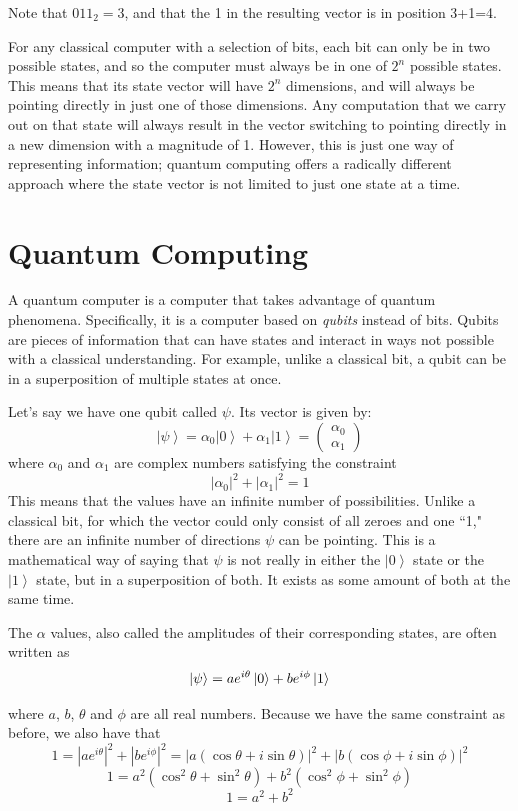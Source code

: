 \documentclass[11pt]{report}
\newcommand{\?}{\stackrel{?}{=}}
\begin{document}
Note that $011_2 = 3$, and that the 1 in the resulting vector is in position 3+1=4.

For any classical computer with a selection of bits, each bit can only be in two possible states, and so the computer must always be in one of $2^n$ possible states. This means that its state vector will have $2^n$ dimensions, and will always be pointing directly in just one of those dimensions. Any computation that we carry out on that state will always result in the vector switching to pointing directly in a new dimension with a magnitude of 1. However, this is just one way of representing information; quantum computing offers a radically different approach where the state vector is not limited to just one state at a time.

\section{Quantum Computing}
A quantum computer is a computer that takes advantage of quantum phenomena. Specifically, it is a computer based on \textit{qubits} instead of bits. Qubits are pieces of information that can have states and interact in ways not possible with a classical understanding. For example, unlike a classical bit, a qubit can be in a superposition of multiple states at once.

Let’s say we have one qubit called $\psi$. Its vector is given by:
$$ \left | \psi \right \rangle=\alpha _{0}\left | 0 \right \rangle+\alpha _{1}\left | 1 \right \rangle=\begin{pmatrix}\alpha_{0}\\ \alpha_{1}\end{pmatrix}$$
where $\alpha _{0}$ and $\alpha_{1}$ are complex numbers satisfying the constraint 
$$ \left | \alpha_{0} \right |^{2} + \left | \alpha_{1} \right |^{2}=1$$
This means that the  values have an infinite number of possibilities. Unlike a classical bit, for which the vector could only consist of all zeroes and one ``1," there are an infinite number of directions $\psi$ can be pointing. This is a mathematical way of saying that $\psi$ is not really in either the $\left | 0 \right \rangle$ state or the $\left | 1 \right \rangle$ state, but in a superposition of both. It exists as some amount of both at the same time.

The $\alpha$ values, also called the amplitudes of their corresponding states, are often written as
$$\ket{\psi} = ae^{i\theta}\ket{0} + be^{i\phi}\ket{1}$$

where $a$, $b$, $\theta$ and $\phi$ are all real numbers. Because we have the same constraint as before, we also have that
$$1 = |ae^{i\theta}|^2 + |be^{i\phi}|^2 = |a(\cos{\theta}+i\sin{\theta})|^2 + |b(\cos{\phi}+i\sin{\phi})|^2$$
$$1 = a^2(\cos^2{\theta} + \sin^2{\theta}) + b^2(\cos^2{\phi} + \sin^2{\phi})$$
$$1 = a^2 + b^2$$ 
\end{document}
